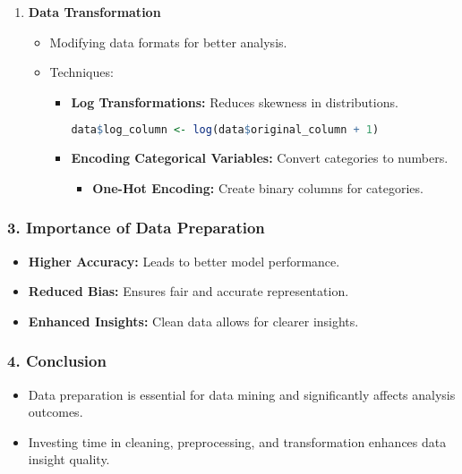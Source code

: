 \documentclass{beamer}
\begin{document}
\begin{frame}
\begin{enumerate}
        \item \textbf{Data Transformation}
        \begin{itemize}
            \item Modifying data formats for better analysis.
            \item Techniques:
            \begin{itemize}
                \item \textbf{Log Transformations:} Reduces skewness in distributions.
                \begin{lstlisting}[language=R]
data$log_column <- log(data$original_column + 1)
                \end{lstlisting}
                
                \item \textbf{Encoding Categorical Variables:} Convert categories to numbers.
                \begin{itemize}
                    \item \textbf{One-Hot Encoding:} Create binary columns for categories.
                \end{itemize}
            \end{itemize}
        \end{itemize}
    \end{enumerate}
\end{frame}

\begin{frame}
    \frametitle{3. Importance of Data Preparation}
    \begin{itemize}
        \item \textbf{Higher Accuracy:} Leads to better model performance.
        \item \textbf{Reduced Bias:} Ensures fair and accurate representation.
        \item \textbf{Enhanced Insights:} Clean data allows for clearer insights.
    \end{itemize}
\end{frame}

\begin{frame}
    \frametitle{4. Conclusion}
    \begin{itemize}
        \item Data preparation is essential for data mining and significantly affects analysis outcomes. 
        \item Investing time in cleaning, preprocessing, and transformation enhances data insight quality.
    \end{itemize}
\end{frame}
\end{document}
